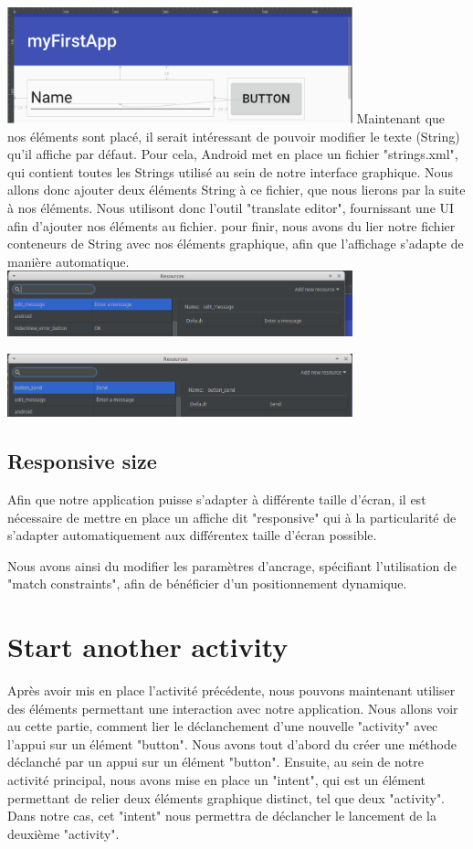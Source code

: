 \documentclass[french,a4paper,12pt]{report}
\begin{document}
\includegraphics[width=10cm]{16.png}
\bigbreak
Maintenant que nos éléments sont placé, il serait intéressant de pouvoir modifier
le texte (String) qu'il affiche par défaut. Pour cela, Android met en place un
fichier "strings.xml", qui contient toutes les Strings utilisé au sein de notre
interface graphique. Nous allons donc ajouter deux éléments String à ce fichier,
que nous lierons par la suite à nos éléments.
\smallbreak
Nous utilisont donc l'outil "translate editor", fournissant une UI afin d'ajouter
nos éléments au fichier.
\bigbreak
pour finir, nous avons du lier notre fichier conteneurs de String avec nos
éléments graphique, afin que l'affichage s'adapte de manière automatique.
\bigbreak
\includegraphics[width=10cm]{19.png}

\includegraphics[width=10cm]{20.png}

\subsection{Responsive size}
Afin que notre application puisse s'adapter à différente taille d'écran, il est
nécessaire de mettre en place un affiche dit "responsive" qui à la particularité
de s'adapter automatiquement aux différentex taille d'écran possible.

Nous avons ainsi du modifier les paramètres d'ancrage, spécifiant l'utilisation
de "match constraints", afin de bénéficier d'un positionnement dynamique.

\section{Start another activity}
Après avoir mis en place l'activité précédente, nous pouvons maintenant utiliser
des éléments permettant une interaction avec notre application. Nous allons voir
au cette partie, comment lier le déclanchement d'une nouvelle "activity" avec
l'appui sur un élément "button".
\bigbreak
Nous avons tout d'abord du créer une méthode déclanché par un appui sur un
élément "button".
\bigbreak
 Ensuite, au sein de notre activité principal, nous avons mise en place un "intent",
 qui est un élément permettant de relier deux éléments graphique distinct, tel
 que deux "activity". Dans notre cas, cet "intent" nous permettra de déclancher
 le lancement de la deuxième "activity".
 \bigbreak
\end{document}

